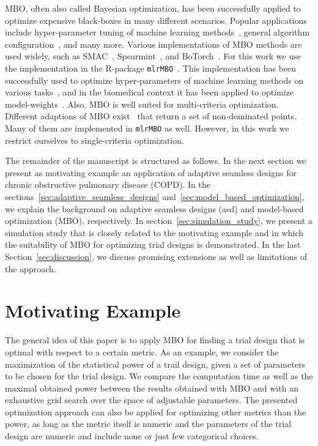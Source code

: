\documentclass[bimj,fleqn]{w-art}
\theoremstyle{plain}
\theoremstyle{definition}
\begin{document}
MBO, often also called Bayesian optimization, has been successfully applied to optimize expensive black-boxes in many different scenarios.
Popular applications include hyper-parameter tuning of machine learning methods~\citep{snoek_practical_2012}, general algorithm configuration~\citep{hutter_sequential_2011}, and many more.
Various implementations of MBO methods are used widely, such as SMAC~\citep{hutter_sequential_2011}, Spearmint~\citep{snoek_practical_2012}, and BoTorch~\citep{balandat_botorch_2020}.
For this work we use the implementation in the R-package \texttt{mlrMBO}~\citep{bischl_mlrmbo_2017}.
This implementation has been successfully used to optimize hyper-parameters of machine learning methods on various tasks~\citep{bischl_mlrmbo_2017, wozniak_candle_2018}, and in the biomedical context it has been applied to optimize model-weights~\citep{richter_modelbased_2019,browaeys_nichenet_2020}.
Also, MBO is well suited for multi-criteria optimization.
Different adaptions of MBO exist~\citep{horn_modelbased_2015} that return a set of non-dominated points.
Many of them are implemented in \texttt{mlrMBO} as well.
However, in this work we restrict ourselves to single-criteria optimization. 

The remainder of the manuscript is structured as follows.
In the next section we present as motivating example an application of adaptive seamless designs for chronic obstructive pulmonary disease (COPD).
In the sections~\ref{sec:adaptive_seamless_designs} and~\ref{sec:model_based_optimization}, we explain the background on adaptive seamless designs (asd) and model-based optimization (MBO), respectively.
In section~\ref{sec:simulation_study}, we present a simulation study that is closely related to the motivating example and in which the suitability of MBO for optimizing trial designs is demonstrated.
In the last Section~\ref{sec:discussion}, we discuss promising extensions as well as limitations of the approach.

\section{Motivating Example}
\label{sect.motivation}

The general idea of this paper is to apply MBO for finding a trial design that is optimal with respect to a certain metric.
As an example, we consider the maximization of the statistical power of a trail design, given a set of parameters to be chosen for the trial design.
We compare the computation time as well as the maximal obtained power between the results obtained with MBO and with an exhaustive grid search over the space of adjustable parameters.
The presented optimization approach can also be applied for optimizing other metrics than the power, as long as the metric itself is numeric and the parameters of the trial design are numeric and include none or just few categorical choices.
\end{document}
